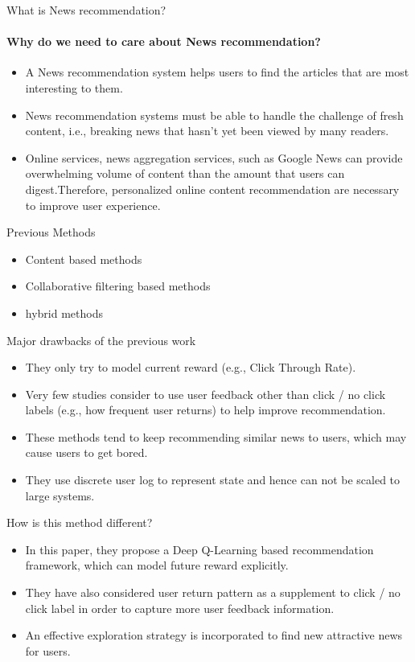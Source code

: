\begin{frame}{What is News recommendation?}
\framesubtitle{Why do we need to care about News recommendation?}
\begin{itemize}
    \item  A News recommendation system helps users to find the articles that are most interesting to them.
    \item News recommendation systems must be able to handle the challenge of fresh content, i.e., breaking news that hasn’t yet been viewed by many readers.
    \item Online services, news aggregation services, such as Google News can provide overwhelming volume of content than the amount that users can digest.Therefore, personalized online content recommendation are necessary to improve user experience.
\end{itemize}
\end{frame}

\begin{frame}{Previous Methods}
   \begin{itemize}
       \item Content based methods
       \item Collaborative filtering based methods
       \item hybrid methods
\end{itemize}
\end{frame}

\begin{frame}{Major drawbacks of the previous work}
   \begin{itemize}
       \item They only try to model current reward (e.g., Click Through Rate).
       \item Very few studies consider to use user feedback other than click / no click labels (e.g., how frequent user returns) to help improve recommendation.
       \item These methods tend to keep recommending similar news to users, which may cause users to get bored.
       \item They use discrete user log to represent state and hence can not be scaled to large systems.
\end{itemize}
\end{frame}

\begin{frame}{How is this method different?}
   \begin{itemize}
       \item In this paper, they propose a Deep Q-Learning based recommendation framework, which can model future reward explicitly.
       \item They have also considered user return pattern as a supplement to click / no click label in order to capture more user feedback information.
       \item An effective exploration strategy is incorporated to find new attractive news for users.
\end{itemize}
\end{frame}

